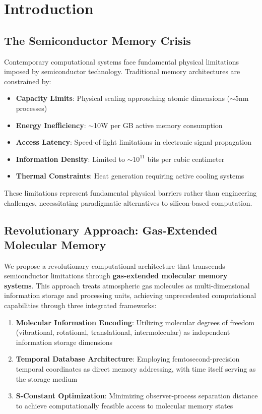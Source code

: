 \documentclass[12pt]{article}
\begin{document}
\section{Introduction}

\subsection{The Semiconductor Memory Crisis}

Contemporary computational systems face fundamental physical limitations imposed by semiconductor technology. Traditional memory architectures are constrained by:

\begin{itemize}
\item \textbf{Capacity Limits}: Physical scaling approaching atomic dimensions ($\sim$5nm processes)
\item \textbf{Energy Inefficiency}: $\sim$10W per GB active memory consumption
\item \textbf{Access Latency}: Speed-of-light limitations in electronic signal propagation  
\item \textbf{Information Density}: Limited to $\sim 10^{11}$ bits per cubic centimeter
\item \textbf{Thermal Constraints}: Heat generation requiring active cooling systems
\end{itemize}

These limitations represent fundamental physical barriers rather than engineering challenges, necessitating paradigmatic alternatives to silicon-based computation.

\subsection{Revolutionary Approach: Gas-Extended Molecular Memory}

We propose a revolutionary computational architecture that transcends semiconductor limitations through \textbf{gas-extended molecular memory systems}. This approach treats atmospheric gas molecules as multi-dimensional information storage and processing units, achieving unprecedented computational capabilities through three integrated frameworks:

\begin{enumerate}
\item \textbf{Molecular Information Encoding}: Utilizing molecular degrees of freedom (vibrational, rotational, translational, intermolecular) as independent information storage dimensions
\item \textbf{Temporal Database Architecture}: Employing femtosecond-precision temporal coordinates as direct memory addressing, with time itself serving as the storage medium
\item \textbf{S-Constant Optimization}: Minimizing observer-process separation distance to achieve computationally feasible access to molecular memory states
\end{enumerate}
\end{document}
